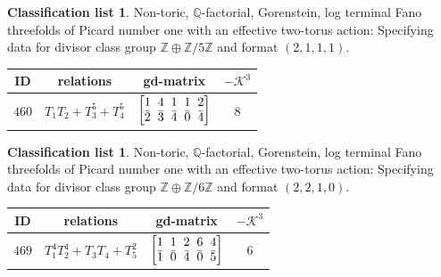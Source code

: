 \documentclass[10pt,a4paper]{amsart}
\theoremstyle{definition}
\newtheorem{class-list}[thm]{Classification list}
\def\ZZ{{\mathbb Z}}
\def\QQ{{\mathbb Q}}
\numberwithin{equation}{section}
\begin{document}
\begin{class-list}
Non-toric, $\QQ$-factorial, Gorenstein, log terminal Fano
threefolds of Picard number one with an effective two-torus action:
Specifying data for divisor class group $\ZZ\oplus \ZZ/5\ZZ$ and
format $(2,1,1,1)$.
\begin{table}[h!]\centering\setlength{\tabcolsep}{5.5pt}
\renewcommand{\arraystretch}{1.1}\small\tabulinesep=1mm
\begin{tabu}{c|c|c|c}
\hline
ID&relations&gd-matrix&$-\mathcal{K}^3$
\\
\hline
${460}$&${T_{1}T_{2}+T_{3}^{5}+T_{4}^{5}}$
&$\arraycolsep=1mm\begin{bmatrix}{1} & {4} & {1} & {1} & {2} \\ {\bar{2}} & {\bar{3}} & {\bar{4}} & {\bar{0}} & {\bar{4}}\end{bmatrix}$&${8}$
\\
\hline
\end{tabu}\vspace{-2mm}
\end{table}
\end{class-list}


\begin{class-list}\label{class-list(0,6)}
Non-toric, $\QQ$-factorial, Gorenstein, log terminal Fano
threefolds of Picard number one with an effective two-torus action:
Specifying data for divisor class group $\ZZ\oplus \ZZ/6\ZZ$ and
format $(2,2,1,0)$.
\begin{table}[h!]\centering\setlength{\tabcolsep}{5.5pt}
\renewcommand{\arraystretch}{1.1}\small\tabulinesep=1mm
\begin{tabu}{c|c|c|c}
\hline
ID&relations&gd-matrix&$-\mathcal{K}^3$
\\
\hline
${469}$&${T_{1}^{4}T_{2}^{4}+T_{3}T_{4}+T_{5}^{2}}$
&$\arraycolsep=1mm\begin{bmatrix}{1} & {1} & {2} & {6} & {4} \\ {\bar{1}} & {\bar{0}} & {\bar{4}} & {\bar{0}} & {\bar{5}}\end{bmatrix}$&${6}$
\\
\hline
\end{tabu}\vspace{-2mm}
\end{table}
\end{class-list}
\end{document}
